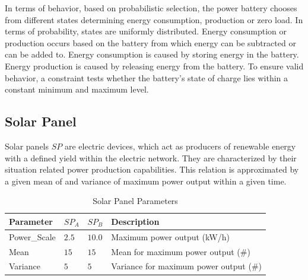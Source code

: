 




In terms of behavior, based on probabilistic selection, the power battery chooses from different states determining energy consumption, production or zero load. In terms of probability, states are uniformly distributed. Energy consumption or production occurs based on the battery from which energy can be subtracted or can be added to. Energy consumption is caused by storing energy in the battery. Energy production is caused by releasing energy from the battery. To ensure valid behavior, a constraint tests whether the battery's state of charge lies within a constant minimum and maximum level.

\subsection{Solar Panel}

Solar panels $SP$ are electric devices, which act as producers of renewable energy with a defined yield within the electric network. They are characterized by their situation related power production capabilities. This relation is approximated by a given mean of and variance of maximum power output within a given time.

\begin{table}[h]
	\renewcommand{\arraystretch}{1.3}
	\caption{Solar Panel Parameters}
	\centering
	\begin{tabular}{llll}
		\hline
		\textbf{Parameter}                     & \textbf{$SP_{A}$} & \textbf{$SP_{B}$} & \textbf{Description} \\ \hline
		Power\_Scale                       	   & $2.5$ & $10.0$ & Maximum power output (kW/h) \\
		Mean                       	  		  & $15$ & $15$ & Mean for maximum power output (\#) \\
		Variance                       	       & $5$ & $5$ & Variance for maximum power output (\#) \\ \hline
	\end{tabular}
\end{table}

